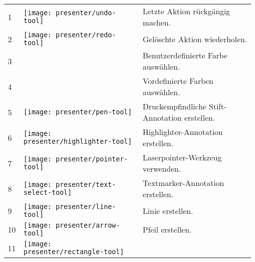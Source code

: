 \begin{longtable}{lp{1cm}p{12cm}}
	1 &
	\begin{minipage}{.06\textwidth}
		\texttt{[image: presenter/undo-tool]}
	\end{minipage}
	& Letzte Aktion rückgängig machen. \\
	2 &
	\begin{minipage}{.06\textwidth}
		\texttt{[image: presenter/redo-tool]}
	\end{minipage}
	& Gelöschte Aktion wiederholen. \\
	3 & & Benutzerdefinierte Farbe auswählen. \\
	4 & & Vordefinierte Farben auswählen. \\
	5 &
	\begin{minipage}{.06\textwidth}
		\texttt{[image: presenter/pen-tool]}
	\end{minipage}
	& Druckempfindliche Stift-Annotation erstellen. \\
	6 &
	\begin{minipage}{.06\textwidth}
		\texttt{[image: presenter/highlighter-tool]}
	\end{minipage}
	& Highlighter-Annotation erstellen. \\
	7 &
	\begin{minipage}{.06\textwidth}
		\texttt{[image: presenter/pointer-tool]}
	\end{minipage}
	& Laserpointer-Werkzeug verwenden. \\
	8 &
	\begin{minipage}{.06\textwidth}
		\texttt{[image: presenter/text-select-tool]}
	\end{minipage}
	& Textmarker-Annotation erstellen. \\
	9 &
	\begin{minipage}{.06\textwidth}
		\texttt{[image: presenter/line-tool]}
	\end{minipage}
	& Linie erstellen. \\
	10 &
	\begin{minipage}{.06\textwidth}
		\texttt{[image: presenter/arrow-tool]}
	\end{minipage}
	& Pfeil erstellen. \\
	11 &
	\begin{minipage}{.06\textwidth}
		\texttt{[image: presenter/rectangle-tool]}
	\end{minipage}

\end{longtable}
